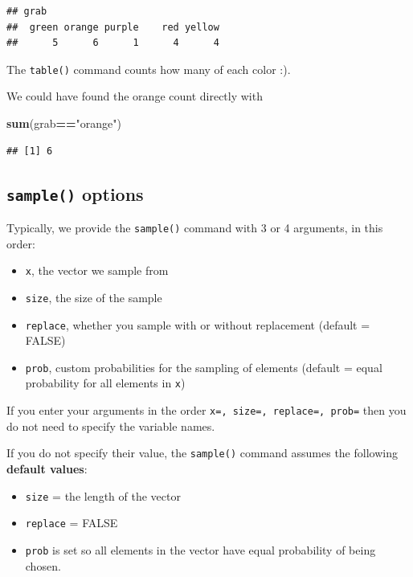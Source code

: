 \documentclass[
]{book}
\newenvironment{Shaded}{\begin{snugshade}}{\end{snugshade}}
\newcommand{\FunctionTok}[1]{\textcolor[rgb]{0.13,0.29,0.53}{\textbf{#1}}}
\newcommand{\NormalTok}[1]{#1}
\newcommand{\SpecialCharTok}[1]{\textcolor[rgb]{0.81,0.36,0.00}{\textbf{#1}}}
\newcommand{\StringTok}[1]{\textcolor[rgb]{0.31,0.60,0.02}{#1}}
\providecommand{\tightlist}{%
  \setlength{\itemsep}{0pt}\setlength{\parskip}{0pt}}
\theoremstyle{definition}
\theoremstyle{definition}
\theoremstyle{definition}
\theoremstyle{definition}
\theoremstyle{remark}
\begin{document}
\begin{verbatim}
## grab
##  green orange purple    red yellow 
##      5      6      1      4      4
\end{verbatim}

The \texttt{table()} command counts how many of each color :).

We could have found the orange count directly with

\begin{Shaded}
\begin{Highlighting}[]
\FunctionTok{sum}\NormalTok{(grab}\SpecialCharTok{==}\StringTok{"orange"}\NormalTok{)}
\end{Highlighting}
\end{Shaded}

\begin{verbatim}
## [1] 6
\end{verbatim}

\subsection{\texorpdfstring{\texttt{sample()} options}{sample() options}}\label{sample-options}

Typically, we provide the \texttt{sample()} command with 3 or 4 arguments, in this order:

\begin{itemize}
\tightlist
\item
  \texttt{x}, the vector we sample from
\item
  \texttt{size}, the size of the sample
\item
  \texttt{replace}, whether you sample with or without replacement (default = FALSE)
\item
  \texttt{prob}, custom probabilities for the sampling of elements (default = equal probability for all elements in \texttt{x})
\end{itemize}

If you enter your arguments in the order \texttt{x=,\ size=,\ replace=,\ prob=} then you do not need to specify the variable names.

If you do not specify their value, the \texttt{sample()} command assumes the following \textbf{default values}:

\begin{itemize}
\tightlist
\item
  \texttt{size} = the length of the vector
\item
  \texttt{replace} = FALSE
\item
  \texttt{prob} is set so all elements in the vector have equal probability of being chosen.
\end{itemize}
\end{document}
